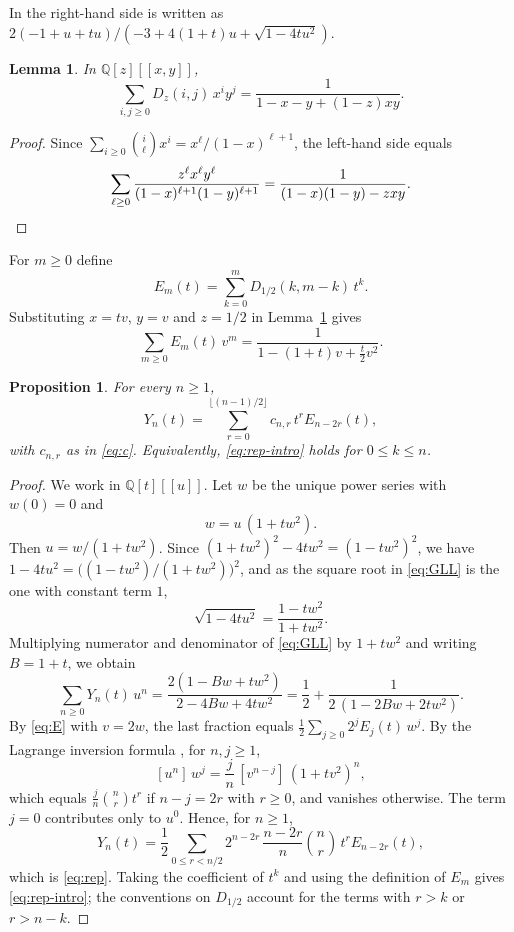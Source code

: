 \documentclass{amsart}
\newtheorem{proposition}[theorem]{Proposition}
\newtheorem{lemma}[theorem]{Lemma}
\theoremstyle{definition}
\theoremstyle{remark}
\numberwithin{equation}{section}
\numberwithin{table}{section}
\newcommand{\Dz}{D_z}
\newcommand{\Dh}{D_{1/2}}
\newcommand{\coef}[1]{[#1]}
\begin{document}
In \cite{GLL} the right-hand side is written as $2(-1+u+tu)/(-3+4(1+t)u+\sqrt{1-4tu^2})$.

\begin{lemma}\label{lem:bivariate}
In $\mathbb{Q}[z][[x,y]]$,
\[
\sum_{i,j\ge 0}\Dz(i,j)\,x^iy^j=\frac{1}{1-x-y+(1-z)xy}.
\]
\end{lemma}

\begin{proof}
Since $\sum_{i\ge 0}\binom{i}{\ell}x^i=x^{\ell}/(1-x)^{\ell+1}$, the left-hand side equals
\[
\sum_{\ell\ge 0}\frac{z^{\ell}x^{\ell}y^{\ell}}{(1-x)^{\ell+1}(1-y)^{\ell+1}}=\frac{1}{(1-x)(1-y)-zxy}. \qedhere
\]
\end{proof}

For $m\ge 0$ define
\[
E_m(t)=\sum_{k=0}^{m}\Dh(k,m-k)\,t^k .
\]
Substituting $x=tv$, $y=v$ and $z=1/2$ in Lemma~\ref{lem:bivariate} gives
\begin{equation}\label{eq:E}
\sum_{m\ge 0}E_m(t)\,v^m=\frac{1}{1-(1+t)v+\tfrac{t}{2}v^2}.
\end{equation}

\begin{proposition}\label{prop:representation}
For every $n\ge 1$,
\begin{equation}\label{eq:rep}
Y_n(t)=\sum_{r=0}^{\lfloor (n-1)/2\rfloor}c_{n,r}\,t^{r}E_{n-2r}(t),
\end{equation}
with $c_{n,r}$ as in \eqref{eq:c}. Equivalently, \eqref{eq:rep-intro} holds for $0\le k\le n$.
\end{proposition}

\begin{proof}
We work in $\mathbb{Q}[t][[u]]$. Let $w$ be the unique power series with $w(0)=0$ and
\[
w=u\,(1+tw^2).
\]
Then $u=w/(1+tw^2)$. Since $(1+tw^2)^2-4tw^2=(1-tw^2)^2$, we have $1-4tu^2=\bigl((1-tw^2)/(1+tw^2)\bigr)^2$, and as the square root in \eqref{eq:GLL} is the one with constant term $1$,
\[
\sqrt{1-4tu^2}=\frac{1-tw^2}{1+tw^2}.
\]
Multiplying numerator and denominator of \eqref{eq:GLL} by $1+tw^2$ and writing $B=1+t$, we obtain
\[
\sum_{n\ge 0}Y_n(t)\,u^n=\frac{2(1-Bw+tw^2)}{2-4Bw+4tw^2}=\frac12+\frac{1}{2\,(1-2Bw+2tw^2)}.
\]
By \eqref{eq:E} with $v=2w$, the last fraction equals $\frac12\sum_{j\ge 0}2^jE_j(t)\,w^j$. By the Lagrange inversion formula \cite[Theorem~5.4.2]{St}, for $n,j\ge 1$,
\[
\coef{u^n}\,w^j=\frac{j}{n}\,\coef{v^{n-j}}\,(1+tv^2)^n,
\]
which equals $\frac{j}{n}\binom{n}{r}t^r$ if $n-j=2r$ with $r\ge 0$, and vanishes otherwise. The term $j=0$ contributes only to $u^0$. Hence, for $n\ge 1$,
\[
Y_n(t)=\frac12\sum_{0\le r<n/2}2^{n-2r}\,\frac{n-2r}{n}\binom{n}{r}\,t^r E_{n-2r}(t),
\]
which is \eqref{eq:rep}. Taking the coefficient of $t^k$ and using the definition of $E_m$ gives \eqref{eq:rep-intro}; the conventions on $\Dh$ account for the terms with $r>k$ or $r>n-k$.
\end{proof}
\end{document}
